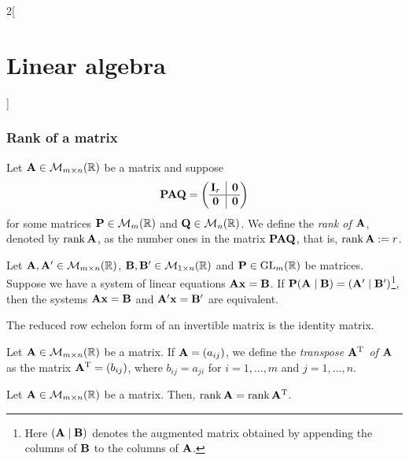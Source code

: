 \documentclass[../../../main.tex]{subfiles}
\begin{document}
\begin{multicols}{2}[\section{Linear algebra}]
\subsubsection*{Rank of a matrix}
\begin{definition}[Rank]
    Let $\vb{A}\in\mathcal{M}_{m\times n}(\mathbb{R})$ be a matrix and suppose 
    $$\mathblack{P}\mathblack{A}\mathblack{Q}=\left(
    \begin{array}{@{\,} c|c @{\,}}
        \mathblack{I}_r & \mathblack{0}\\
        \hline
        \mathblack{0} & \mathblack{0}
    \end{array}
    \right)$$ for some matrices $\vb{P}\in\mathcal{M}_m(\mathbb{R})$ and $\vb{Q}\in\mathcal{M}_n(\mathbb{R})$. We define the \textit{rank of $\vb{A}$}, denoted by $\rank \vb{A}$, as the number ones in the matrix $\vb{P}\vb{A}\vb{Q}$, that is, $\rank\vb{A}:=r$.
\end{definition}
\begin{prop}
    Let $\vb{A},\vb{A}'\in\mathcal{M}_{m\times n}(\mathbb{R})$, $\vb{B},\vb{B}'\in\mathcal{M}_{1\times n}(\mathbb{R})$ and $\vb{P}\in\mathrm{GL}_m(\mathbb{R})$ be matrices. Suppose we have a system of linear equations $\vb{A}\vb{x}=\vb{B}$. If $\vb{P}(\vb{A}\mid\vb{B})=(\vb{A}'\mid\vb{B}')$\footnote{Here $(\vb{A}\mid\vb{B})$ denotes the augmented matrix obtained by appending the columns of $\vb{B}$ to the columns of $\vb{A}$.}, then the systems $\vb{A}\vb{x}=\vb{B}$ and $\vb{A}'\vb{x}=\vb{B}'$ are equivalent.
\end{prop}
\begin{corollary}
    The reduced row echelon form of an invertible matrix is the identity matrix.
\end{corollary}
\begin{definition}[Transposition]
    Let $\vb{A}\in\mathcal{M}_{m\times n}(\mathbb{R})$ be a matrix. If $\vb{A}=(a_{ij})$, we define the \textit{transpose $\vb{A}^{\mathrm{T}}$ of $\vb{A}$} as the matrix $\vb{A}^{\mathrm{T}}=(b_{ij})$, where $b_{ij}=a_{ji}$ for $i=1,\ldots,m$ and $j=1,\ldots,n$.
\end{definition}
\begin{prop}
    Let $\vb{A}\in\mathcal{M}_{m\times n}(\mathbb{R})$ be a matrix. Then, $\rank \vb{A}=\rank\vb{A}^{\mathrm{T}}$.
\end{prop}
\begin{theorem}

\end{theorem}
\end{multicols}
\end{document}
